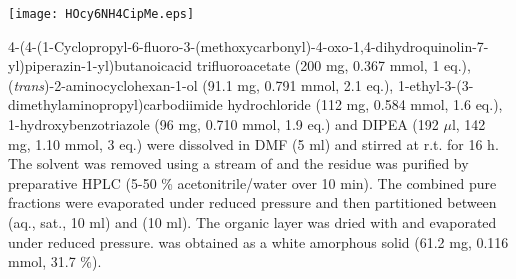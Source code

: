 \begin{scheme}[H]
	\begin{center}
		\texttt{[image: HOcy6NH4CipMe.eps]}
	\end{center}
\end{scheme}

4\hyp{}(4\hyp{}(1\hyp{}Cyclopropyl\hyp{}6\hyp{}fluoro\hyp{}3\hyp{}(methoxycarbonyl)\hyp{}4\hyp{}oxo\hyp{}1,4\hyp{}dihydroquinolin\hyp{}7\hyp{}yl)piperazin\hyp{}1\hyp{}yl)butanoic\hfill acid trifluoroacetate  (200 mg, 0.367 mmol, 1 eq.), (\textit{trans})\hyp{}2\hyp{}aminocyclohexan\hyp{}1\hyp{}ol  (91.1 mg, 0.791 mmol, 2.1 eq.), 1-ethyl-3-(3-dimethylaminopropyl)carbodi\allowbreak imide hydrochloride (112 mg, 0.584 mmol, 1.6 eq.), 1-hydroxyben\allowbreak zotriazole (96 mg, 0.710 mmol, 1.9 eq.) and DIPEA (192 $\mu$l, 142 mg, 1.10 mmol, 3 eq.) were dissolved in DMF (5 ml) and stirred at r.t. for 16 h. The solvent was removed using a stream of  and the residue was purified by preparative HPLC (5-50 \% acetonitrile/water over 10 min). The combined pure fractions were evaporated under reduced pressure and then partitioned between  (aq., sat., 10 ml) and  (10 ml). The organic layer was dried with  and evaporated under reduced pressure.  was obtained as a white amorphous solid (61.2 mg, 0.116 mmol, 31.7 \%).
\\[1\baselineskip]
\\[1\baselineskip]
